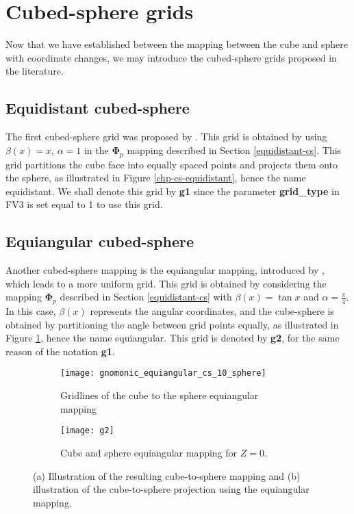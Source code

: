 \newpage
\section{Cubed-sphere grids}
\label{sec-cs-grids}
Now that we have established between the mapping between the cube and sphere with coordinate changes,
we may introduce the cubed-sphere grids proposed in the literature.

\subsection{Equidistant cubed-sphere}
\label{cs-equidistant}
The first cubed-sphere grid was proposed by \citet{sadourny:1972}. This grid is obtained by using
$\beta(x) = x$, $\alpha=1$ in the $\boldsymbol{\Phi}_p$ mapping described in Section \ref{equidistant-cs}.
This grid partitions the cube face into equally spaced points
and projects them onto the sphere, as illustrated in Figure
\ref{chp-cs-equidistant}, hence the name equidistant.
We shall denote this grid by \textbf{g1} since the parameter
\textbf{grid\_type} in FV3 is set equal to 1 to use this grid.

\subsection{Equiangular cubed-sphere}
\label{cs-equiangular}
Another cubed-sphere mapping is the equiangular mapping, 
introduced by \citet{ronchi:1996}, which leads to a more uniform grid.
This grid is obtained by considering the mapping $\boldsymbol{\Phi}_p$ described in Section \ref{equidistant-cs}
with $\beta(x) = \tan{x}$ and $\alpha=\frac{\pi}{4}$.
In this case, $\beta(x)$ represents the angular coordinates, and the cube-sphere is obtained by partitioning the angle between
grid points equally, as illustrated in Figure \ref{chp-cs-equiangular}, hence the name equiangular.
This grid is denoted by \textbf{g2}, for the same reason of the notation \textbf{g1}.
\begin{figure}[!htb]
	\centering
	\begin{subfigure}{0.42\textwidth}
		\texttt{[image: gnomonic\_equiangular\_cs\_10\_sphere]}
		\caption{Gridlines of the cube to the sphere equiangular mapping}
	\end{subfigure}
	\begin{subfigure}{0.42\textwidth}
		\centering
		\texttt{[image: g2]}
		\caption{Cube and sphere equiangular mapping for $Z=0$.}
	\end{subfigure}
	\caption{(a) Illustration of the resulting cube-to-sphere mapping and (b) illustration of the cube-to-sphere projection using the equiangular mapping.\label{chp-cs-equiangular}}
\end{figure}

